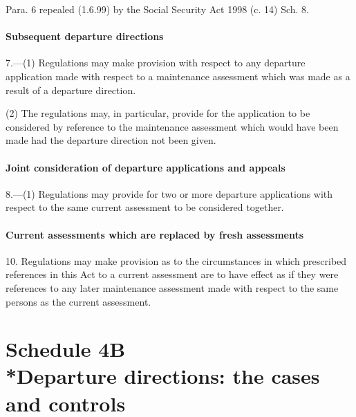 \documentclass[12pt,a4paper]{article}
\begin{document}
{{\medskip

Para. 6 repealed (1.6.99) by the Social Security Act 1998 (c. 14) Sch. 8.

}

\subsection*{Subsequent departure directions}

7.—(1) Regulations may make provision with respect to any departure application
made with respect to a maintenance assessment which was made as a result of a departure
direction.

(2) The regulations may, in particular, provide for the application to be considered by reference to the maintenance assessment which would have been made had the departure direction not been given.

\subsection*{Joint consideration of departure applications and appeals}

8.—(1) Regulations may provide for two or more departure applications with respect to the same current assessment to be considered together.


\subsection*{Current assessments which are replaced by fresh assessments}

10. Regulations may make provision as to the circumstances in which prescribed references in this Act to a current assessment are to have effect as if they were references to any later maintenance assessment made with respect to the same persons as the current assessment.

\part[Schedule 4B --- Departure directions: the cases and controls]{Schedule 4B\\*Departure directions: the cases and controls}

}
\end{document}
